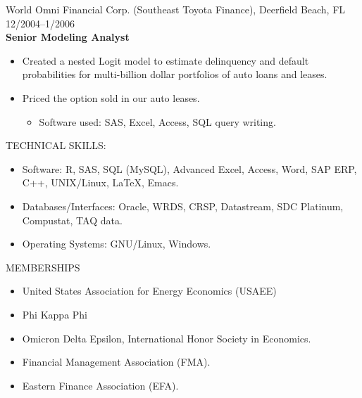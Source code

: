 \documentclass[9pt]{article}
\begin{document}
\vspace{5pt}
World Omni Financial Corp. (Southeast Toyota Finance), Deerfield Beach, FL \hfill  \hfill 12/2004--1/2006\\
{\bf Senior Modeling Analyst}
\begin{itemize}[noitemsep, nolistsep]
\item Created a nested Logit model to estimate delinquency and default probabilities for multi-billion dollar portfolios of auto loans and leases.
\item Priced the option sold in our auto leases.
\begin{itemize}[noitemsep, nolistsep]
\item Software used:  SAS, Excel, Access, SQL query writing.
\end{itemize}
\end{itemize}
\vspace{10pt}
TECHNICAL SKILLS:
\begin{itemize}[noitemsep, nolistsep]
\item Software: R, SAS, SQL (MySQL), Advanced Excel, Access, Word, SAP ERP, C++, UNIX/Linux, \LaTeX, Emacs. 
\item Databases/Interfaces: Oracle, WRDS, CRSP, Datastream, SDC Platinum, Compustat, TAQ data.
\item Operating Systems: GNU/Linux, Windows.
\end{itemize}
\vspace{10pt}
MEMBERSHIPS
\begin{itemize}[noitemsep, nolistsep]
\item United States Association for Energy Economics (USAEE)
\item Phi Kappa Phi
\item Omicron Delta Epsilon, International Honor Society in Economics.
\item Financial Management Association (FMA).
\item Eastern Finance Association (EFA).
\end{itemize}
\vspace{15pt}
\end{document}
